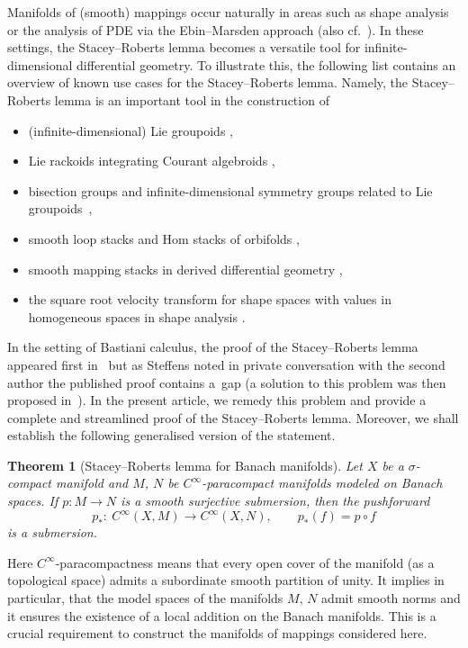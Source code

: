 \documentclass[pdftex]{sigma}
\numberwithin{equation}{section}
\newtheorem{theoremA}{Theorem}
\begin{document}
Manifolds of (smooth) mappings occur naturally in areas such as shape analysis or the \mbox{analysis} of PDE via the Ebin--Marsden approach (also cf.\ \cite{Sch23}). In these settings, the Stacey--Roberts lemma becomes a versatile tool for infinite-dimensional differential geometry. To illustrate this, the following list contains an overview of known use cases for the Stacey--Roberts lemma. Namely, the Stacey--Roberts lemma is an important tool in the construction of
\begin{itemize}\itemsep=0pt
\item (infinite-dimensional) Lie groupoids \cite{AaGaS20},
\item Lie rackoids integrating Courant algebroids \cite{LGaW20},
\item bisection groups and infinite-dimensional symmetry groups related to Lie groupoids~\cite{AaS19,AaS19b,Sch20},
\item smooth loop stacks and Hom stacks of orbifolds \cite{RaV18,RaV18b},
\item smooth mapping stacks in derived differential geometry \cite{ste24},
\item the square root velocity transform for shape spaces with values in homogeneous spaces in shape analysis \cite{CaEaS18}.
\end{itemize}
In the setting of Bastiani calculus, the proof of the Stacey--Roberts lemma appeared first in~\cite{AaS19} but as Steffens noted in private conversation with the second author the published proof contains a~gap (a solution to this problem was then proposed in~\cite{ste24}).
In the present article, we remedy this problem and provide a complete and streamlined proof of the Stacey--Roberts lemma. Moreover, we shall establish the following generalised version of the statement.

\begin{theoremA}[Stacey--Roberts lemma for Banach manifolds] \label{TheoremA}
Let $X$ be a $\sigma$-compact manifold and $M$, $N$ be $C^\infty$-paracompact manifolds modeled on Banach spaces.
If $p \colon M \rightarrow N$ is a smooth surjective submersion, then the pushforward
\begin{displaymath} p_\ast \colon\ C^\infty (X,M) \rightarrow C^\infty (X,N),\qquad p_\ast (f)=p\circ f\end{displaymath}
 is a submersion.
\end{theoremA}

Here $C^\infty$-paracompactness means that every open cover of the manifold (as a topological space) admits a subordinate smooth partition of unity. It implies in particular, that the model spaces of the manifolds $M$, $N$ admit smooth norms and it ensures the existence of a local addition on the Banach manifolds. This is a crucial requirement to construct the manifolds of mappings considered here.
\end{document}
